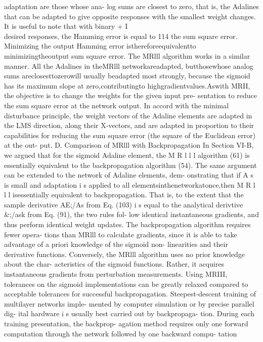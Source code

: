 adaptation are those whose ana- log sums are closest to zero, that is,
the Adalines that can be adapted to give opposite responses with the
smallest weight changes. It is useful to note that with binary + I\\
desired responses, the Hamming error is equal to 114 the sum square
error. Minimizing the output Hamming error isthereforeequivalentto
minimizingtheoutput sum square error. The MRlll algorithm works in a
similar manner. All the Adalines in theMRlll networkareadapted,
butthosewhose analog sums areclosesttozerowill usually beadapted most
strongly, because the sigmoid has its maximum slope at
zero,contributingto highgradientvalues.Aswith MRII, the objective is to
change the weights for the given input pre- sentation to reduce the sum
square error at the network output. In accord with the minimal
disturbance principle, the weight vectors of the Adaline elements are
adapted in the LMS direction, along their X-vectors, and are adapted in
proportion to their capabilities for reducing the sum square error (the
square of the Euclidean error) at the out- put. D. Comparison of MRlll
with Backpropagation In Section VI-B, we argued that for the sigmoid
Adaline element, the M R l l l algorithm (61) is essentially equivalent
to the backpropagation algorithm (54). The same argument can be extended
to the network of Adaline elements, dem- onstrating that if A s is small
and adaptation i s applied to all elementsinthenetworkatonce,then M R l
l l isessentially equivalent to backpropagation. That is, to the extent
that the sample derivative AE;/As from Eq. (103) i s equal to the
analytical derivtive \&;/ask from Eq. (91), the two rules fol- low
identical instantaneous gradients, and thus perform identical weight
updates. The backpropagation algorithm requires fewer opera- tions than
MRlll to calculate gradients, since it is able to take advantage of a
priori knowledge of the sigmoid non- linearities and their derivative
functions. Conversely, the MRlll algorithm uses no prior knowledge about
the char- acteristics of the sigmoid functions. Rather, it acquires
instantaneous gradients from perturbation measurements. Using MRIII,
tolerances on the sigmoid implementations can be greatly relaxed
compared to acceptable tolerances for successful backpropagation.
Steepest-descent training of multilayer networks imple- mented by
computer simulation or by precise parallel dig- ital hardware i s
usually best carried out by backpropaga- tion. During each training
presentation, the backprop- agation method requires only one forward
computation through the network followed by one backward compu- tation
